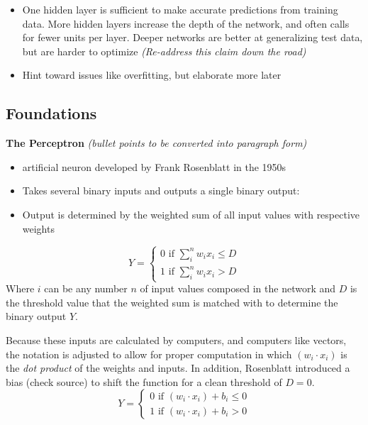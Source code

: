 \begin{itemize}
\tightlist
  
\item
  One hidden layer is sufficient to make accurate predictions from
  training data. More hidden layers increase the depth of the network,
  and often calls for fewer units per layer. Deeper networks are better
  at generalizing test data, but are harder to optimize
  \cite{Goodfellow-et-al-2016} \emph{(Re-address this claim down the
  road)}
\item 
    Hint toward issues like overfitting, but elaborate more later
\end{itemize}

\hypertarget{foundations}{%
\subsection{Foundations}\label{foundations}}

\textbf{The Perceptron} \textit{(bullet points to be converted into paragraph form)}

\begin{itemize}
\tightlist
\item
  artificial neuron developed by Frank Rosenblatt in the 1950s
  \cite{nielsen}
\item
  Takes several binary inputs and outputs a single binary output:
\item
  Output is determined by the weighted sum of all input values with
  respective weights
\end{itemize}

\[
Y = 
\begin{cases}
0 \text{ if } \sum_i^n w_ix_i \le D \\
1 \text{ if } \sum_i^n w_ix_i > D
\end{cases}
\] Where \(i\) can be any number \(n\) of input values composed in the
network and \(D\) is the threshold value that the weighted sum is
matched with to determine the binary output \(Y\).

Because these inputs are calculated by computers, and computers like
vectors, the notation is adjusted to allow for proper computation in which $(w_i \cdot x_i)$ is the \textit{dot product} of the weights and inputs. In
addition, Rosenblatt introduced a bias (check source) to shift the
function for a clean threshold of \(D = 0\). \[
Y = 
\begin{cases}
0 \text{ if } (w_i \cdot x_i) + b_i \le 0 \\
1 \text{ if } (w_i \cdot x_i) + b_i > 0
\end{cases}
\]

